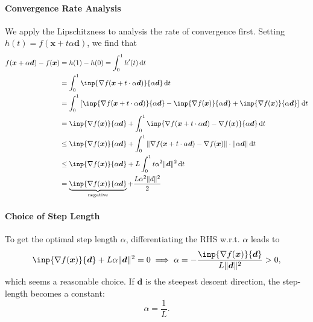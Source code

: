 \paragraph{Convergence Rate Analysis}
We apply the Lipschitzness to analysis the rate of convergence first. Setting $h(t) = f(\bm x+t\alpha\bm d)$, we find that
\begin{align*}
f(\bm x+\alpha\bm d) - f(\bm x)&=h(1) - h(0)=
\int_0^1
h'(t)\diff t\\
&=
\int_0^1
\inp{\nabla f(\bm x+t\cdot\alpha\bm d)}{\alpha \bm d}\diff t\\
&=
\int_0^1\left[
\inp{\nabla f(\bm x+t\cdot\alpha\bm d)}{\alpha \bm d}
-
\inp{\nabla f(\bm x)}{\alpha\bm d}
+
\inp{\nabla f(\bm x)}{\alpha\bm d}
\right]\diff t\\
&=\inp{\nabla f(\bm x)}{\alpha\bm d}+\int_0^1
\inp{\nabla f(\bm x+t\cdot\alpha\bm d) - \nabla f(\bm x)}{\alpha \bm d}
\diff t\\
&\le
\inp{\nabla f(\bm x)}{\alpha\bm d}
+
\int_0^1\|\nabla f(\bm x+t\cdot \alpha\bm d) - \nabla f(\bm x)\|\cdot\|\alpha\bm d\|\diff t\\
&\le \inp{\nabla f(\bm x)}{\alpha\bm d}
+L\int_0^1t\alpha^2\|\bm d\|^2\diff t\\
&=\underbrace{\inp{\nabla f(\bm x)}{\alpha\bm d}}_{\text{negative}}+\frac{L\alpha^2\| d\|^2}{2}
\end{align*}

\paragraph{Choice of Step Length}
To get the optimal step length $\alpha$, differentiating the RHS w.r.t. $\alpha$ leads to
\[
\inp{\nabla f(\bm x)}{\bm d}+L\alpha\|\bm d\|^2=0\implies
\alpha=-\frac{\inp{\nabla f(\bm x)}{\bm d}}{L\|\bm d\|^2}>0,
\]
which seems a reasonable choice. If $\bm d$ is the steepest descent direction, the step-length becomes a constant:
\[
\alpha=\frac{1}{L}.
\]












